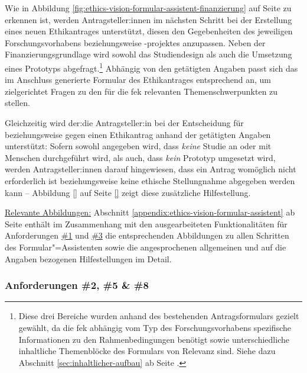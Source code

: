 \documentclass[a4paper,12pt,twoside]{scrreprt}
\begin{document}
Wie in Abbildung \ref{fig:ethics-vision-formular-assistent-finanzierung} auf Seite \pageref{fig:ethics-vision-formular-assistent-finanzierung} zu erkennen ist, werden Antragsteller:innen im nächsten Schritt bei der Erstellung eines neuen Ethikantrages unterstützt, diesen den Gegebenheiten des jeweiligen Forschungsvorhabens beziehungsweise -projektes anzupassen. Neben der Finanzierungsgrundlage wird sowohl das Studiendesign als auch die Umsetzung eines Prototyps abgefragt.\footnote{Diese drei Bereiche wurden anhand des bestehenden Antragsformulars gezielt gewählt, da die \ac{fek} abhängig vom Typ des Forschungsvorhabens spezifische Informationen zu den Rahmenbedingungen benötigt sowie unterschiedliche inhaltliche Themenblöcke des Formulars von Relevanz sind. Siehe dazu Abschnitt \ref{sec:inhaltlicher-aufbau} ab Seite \pageref{sec:inhaltlicher-aufbau}.} Abhängig von den getätigten Angaben passt sich das im Anschluss generierte Formular des Ethikantrages entsprechend an, um zielgerichtet Fragen zu den für die \ac{fek} relevanten Themenschwerpunkten zu stellen.

Gleichzeitig wird der:die Antragsteller:in bei der Entscheidung für beziehungsweise gegen einen Ethikantrag anhand der getätigten Angaben unterstützt: Sofern sowohl angegeben wird, dass \textit{keine} Studie an oder mit Menschen durchgeführt wird, als auch, dass \textit{kein} Prototyp umgesetzt wird, werden Antragsteller:innen darauf hingewiesen, dass ein Antrag womöglich nicht erforderlich ist beziehungsweise keine ethische Stellungnahme abgegeben werden kann -- Abbildung \ref{} auf Seite \ref{} zeigt diese zusätzliche Hilfestellung.

\medskip

\noindent\underline{Relevante Abbildungen:} Abschnitt \ref{appendix:ethics-vision-formular-assistent} ab Seite \pageref{appendix:ethics-vision-formular-assistent} enthält im Zusammenhang mit den ausgearbeiteten Funktionalitäten für Anforderungen \hyperref[sub-sub-sec:abgeleitete-anforderungen-vorfeld-antrag]{\#1} und \hyperref[sub-sub-sec:abgeleitete-anforderungen-während-erstellung-einreichung]{\#3} die entsprechenden Abbildungen zu allen Schritten des Formular"=Assistenten sowie die angesprochenen allgemeinen und auf die Angaben bezogenen Hilfestellungen im Detail.

\subsubsection*{Anforderungen \#2, \#5 \& \#8}
\label{sub-sub-sec:umgesetzte-funktionalitäten-anforderung-2-5-8}
\end{document}
